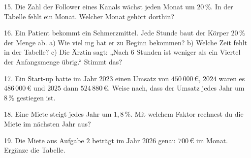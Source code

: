 \documentclass[11pt]{article}
\begin{document}
\begin{pfaufg}{}{15.}{}
Die Zahl der Follower eines Kanals wächst jeden Monat um $20\,\%$. In der Tabelle fehlt ein Monat. Welcher Monat gehört dorthin? \newline{}
\end{pfaufg}

\begin{pfaufg}{}{16.}{}
Ein Patient bekommt ein Schmerzmittel. Jede Stunde baut der Körper $20\,\%$ der Menge ab. a) Wie viel mg hat er zu Beginn bekommen? b) Welche Zeit fehlt in der Tabelle? c) Die Ärztin sagt: „Nach $6$ Stunden ist weniger als ein Viertel der Anfangsmenge übrig.“ Stimmt das? \newline{}
\end{pfaufg}

\begin{pfaufg}{}{17.}{}
Ein Start-up hatte im Jahr $2023$ einen Umsatz von $450\,000\,€$, $2024$ waren es $486\,000\,€$ und $2025$ dann $524\,880\,€$. Weise nach, dass der Umsatz jedes Jahr um $8\,\%$ gestiegen ist.
\end{pfaufg}

\begin{pfaufg}{}{18.}{}
Eine Miete steigt jedes Jahr um $1{,}8\,\%$. Mit welchem Faktor rechnest du die Miete im nächsten Jahr aus?\par\smallskip {}\par {}
\end{pfaufg}

\begin{pfaufg}{}{19.}{}
Die Miete aus Aufgabe $2$ beträgt im Jahr $2026$ genau $700\,€$ im Monat. Ergänze die Tabelle. \newline{}
\end{pfaufg}
\end{document}
